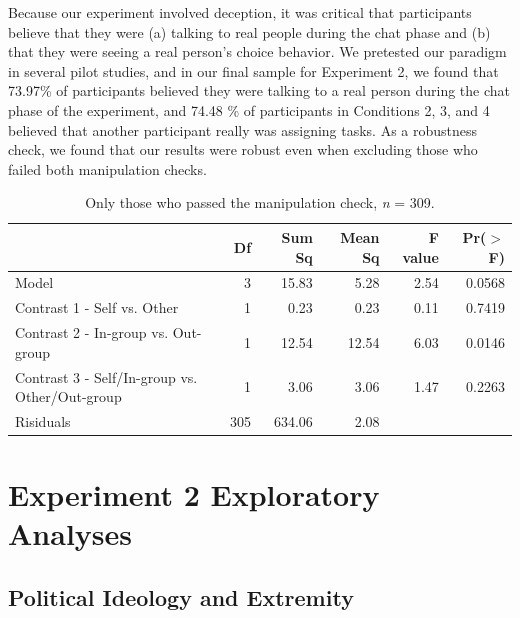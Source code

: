 \documentclass[12pt,]{article}
\begin{document}
Because our experiment involved deception, it was critical that participants believe that they were (a) talking to real people during the chat phase and (b) that they were seeing a real person's choice behavior. We pretested our paradigm in several pilot studies, and in our final sample for Experiment 2, we found that  73.97\% of participants believed they were talking to a real person during the chat phase of the experiment, and 74.48 \% of participants in Conditions 2, 3, and 4 believed that another participant really was assigning tasks. As a robustness check, we found that our results were robust even when excluding those who failed both manipulation checks. 

\vspace{0.6cm}

\begin{table}[ht]
\centering
\begin{tabular}{lrrrrr}
  \hline
 & Df & Sum Sq & Mean Sq & F value & Pr($>$F) \\ 
  \hline
Model & 3 & 15.83 & 5.28 & 2.54 & 0.0568 \\ 
  Contrast 1 - Self vs. Other & 1 & 0.23 & 0.23 & 0.11 & 0.7419 \\ 
  Contrast 2 - In-group vs. Out-group & 1 & 12.54 & 12.54 & 6.03 & 0.0146 \\ 
  Contrast 3 - Self/In-group vs. Other/Out-group & 1 & 3.06 & 3.06 & 1.47 & 0.2263 \\ 
  Risiduals & 305 & 634.06 & 2.08 &  &  \\ 
   \hline
\end{tabular}
\caption{Only those who passed the manipulation check, \emph{n} = 309.} 
\label{manip2}
\end{table}



\clearpage
\section{Experiment 2 Exploratory Analyses}
\label{appendix:explore2}



\subsection{Political Ideology and Extremity}
\label{appendix:ideo_extrem2}
\end{document}
